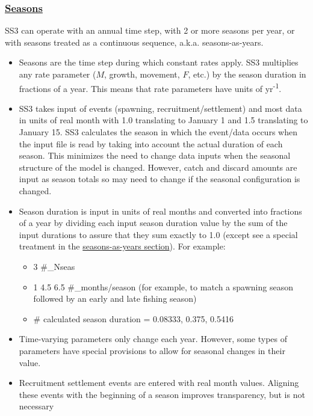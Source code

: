 \hypertarget{Seasons}{}
\subsubsection[Seasons]{\protect\hyperlink{Seasons}{Seasons}}
SS3 can operate with an annual time step, with 2 or more seasons per year, or with seasons treated as a continuous sequence, a.k.a. seasons-as-years.
	 \begin{itemize}
	 	\item Seasons are the time step during which constant rates apply. SS3 multiplies any rate parameter ($M$, growth, movement, $F$, etc.) by the season duration in fractions of a year. This means that rate parameters have units of yr\textsuperscript{-1}.
	 	\item SS3 takes input of events (spawning, recruitment/settlement) and most data in units of real month with 1.0 translating to January 1 and 1.5 translating to January 15. SS3 calculates the season in which the event/data occurs when the input file is read by taking into account the actual duration of each season. This minimizes the need to change data inputs when the seasonal structure of the model is changed. However, catch and discard amounts are input as season totals so may need to change if the seasonal configuration is changed.
	 	\item Season duration is input in units of real months and converted into fractions of a year by dividing each input season duration value by the sum of the input durations to assure that they sum exactly to 1.0 (except see a special treatment in the \hyperlink{continuous-seasonal-recruitment-sec}{seasons-as-years section}). For example:
		\begin{itemize}
			\item 3 \#\_Nseas
			\item 1 4.5 6.5 \#\_months/season (for example, to match a spawning season followed by an early and late fishing season)
			\item \# calculated season duration = 0.08333, 0.375, 0.5416
		\end{itemize}
	 	\item Time-varying parameters only change each year. However, some types of parameters have special provisions to allow for seasonal changes in their value. 
	 	\item Recruitment settlement events are entered with real month values. Aligning these events with the beginning of a season improves transparency, but is not necessary 
	 \end{itemize}

